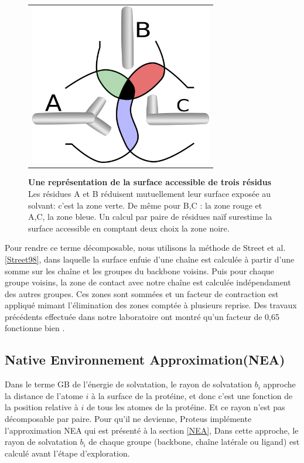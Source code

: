    \begin{figure}[!htbp]
     \centering
     \begin{tabular}{c}
       \includegraphics[width=8cm]{figure/intersurface.png} 
     \end{tabular}
     
     \caption{\textbf{Une représentation de la surface accessible de trois résidus} Les résidues A et B réduisent mutuellement leur surface exposée au solvant: c'est la zone verte. De même pour B,C : la zone rouge et  A,C, la zone bleue. Un calcul par paire de résidues naïf surestime la surface accessible en comptant deux choix la zone noire. }
\label{fig:intersurf}
   \end{figure}


Pour rendre ce terme décomposable, nous utilisons la méthode de Street et al. \ref{Street98}, dans laquelle la surface enfuie d'une chaîne est calculée à partir d'une somme sur les chaîne et les groupes du backbone voisins. Puis pour chaque groupe voisins, la zone de contact avec notre chaîne est calculée indépendament des autres groupes. Ces zones sont sommées et un facteur de contraction est appliqué mimant l'élimination des zones comptée à plusieurs reprise. Des travaux précédents effectuée dans notre laboratoire ont montré qu'un facteur de 0,65 fonctionne bien \cite{Lopes07,Gaillard14}.   


\subsection{\og Native Environnement Approximation\fg (NEA)}

Dans le terme GB de l'énergie de solvatation, le rayon de solvatation $b_i$ approche la distance de l'atome $i$ à la surface de la protéine, et donc c'est une fonction de la position relative à $i$ de tous les atomes de la protéine. Et ce rayon n'est pas décomposable par paire. Pour qu'il ne devienne, Proteus implémente l'approximation  NEA qui est présenté à  la section \ref{NEA}, 
Dans cette approche, le rayon de solvatation $b_i$ de chaque groupe (backbone, chaîne latérale ou ligand)  est calculé avant l'étape d'exploration.


